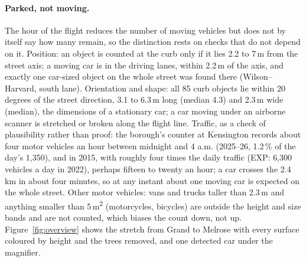 \documentclass[11pt]{article}
\begin{document}
\paragraph{Parked, not moving.} The hour of the flight reduces the number of moving vehicles but does not by itself say how many remain, so the distinction rests on checks that do not depend on it. Position: an object is counted at the curb only if it lies 2.2 to 7\,m from the street axis; a moving car is in the driving lanes, within 2.2\,m of the axis, and exactly one car-sized object on the whole street was found there (Wilson--Harvard, south lane). Orientation and shape: all 85 curb objects lie within 20 degrees of the street direction, 3.1 to 6.3\,m long (median 4.3) and 2.3\,m wide (median), the dimensions of a stationary car; a car moving under an airborne scanner is stretched or broken along the flight line. Traffic, as a check of plausibility rather than proof: the borough's counter at Kensington records about four motor vehicles an hour between midnight and 4 a.m. (2025--26, 1.2\,\% of the day's 1,350), and in 2015, with roughly four times the daily traffic (EXP: 6,300 vehicles a day in 2022), perhaps fifteen to twenty an hour; a car crosses the 2.4\,km in about four minutes, so at any instant about one moving car is expected on the whole street. Other motor vehicles: vans and trucks taller than 2.3\,m and anything smaller than 5\,m\textsuperscript{2} (motorcycles, bicycles) are outside the height and size bands and are not counted, which biases the count down, not up. Figure~\ref{fig:overview} shows the stretch from Grand to Melrose with every surface coloured by height and the trees removed, and one detected car under the magnifier.
\end{document}
